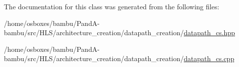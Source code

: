 The documentation for this class was generated from the following files\+:\begin{DoxyCompactItemize}
\item 
/home/osboxes/bambu/\+Pand\+A-\/bambu/src/\+H\+L\+S/architecture\+\_\+creation/datapath\+\_\+creation/\hyperlink{datapath__cs_8hpp}{datapath\+\_\+cs.\+hpp}\item 
/home/osboxes/bambu/\+Pand\+A-\/bambu/src/\+H\+L\+S/architecture\+\_\+creation/datapath\+\_\+creation/\hyperlink{datapath__cs_8cpp}{datapath\+\_\+cs.\+cpp}\end{DoxyCompactItemize}
